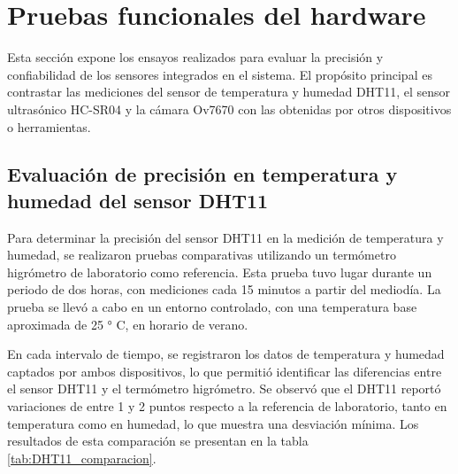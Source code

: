 \vspace{1cm}

\section{Pruebas funcionales del hardware}
\label{pruebas_funcionales_hardware}

Esta sección expone los ensayos realizados para evaluar la precisión y confiabilidad de los sensores integrados en el sistema. El propósito principal es contrastar las mediciones del sensor de temperatura y humedad DHT11, el sensor ultrasónico HC-SR04 y la cámara Ov7670 con las obtenidas por otros dispositivos o herramientas.

\subsection{Evaluación de precisión en temperatura y humedad del sensor DHT11}

Para determinar la precisión del sensor DHT11 en la medición de temperatura y humedad, se realizaron pruebas comparativas utilizando un termómetro higrómetro de laboratorio como referencia. Esta prueba tuvo lugar durante un periodo de dos horas, con mediciones cada 15 minutos a partir del mediodía. La prueba se llevó a cabo en un entorno controlado, con una temperatura base aproximada de 25 ° C, en horario de verano.

En cada intervalo de tiempo, se registraron los datos de temperatura y humedad captados por ambos dispositivos, lo que permitió identificar las diferencias entre el sensor DHT11 y el termómetro higrómetro. Se observó que el DHT11 reportó variaciones de entre 1 y 2 puntos respecto a la referencia de laboratorio, tanto en temperatura como en humedad, lo que muestra una desviación mínima. Los resultados de esta comparación se presentan en la tabla \ref{tab:DHT11_comparacion}.

\newpage

